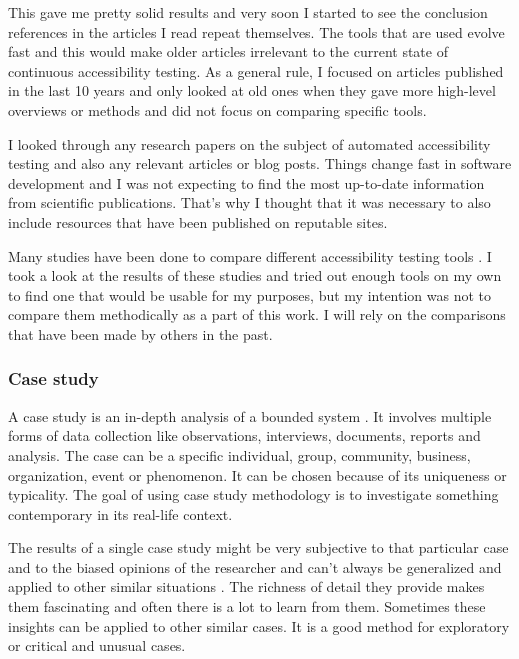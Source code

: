 \documentclass{master_thesis}
\begin{document}
This gave me pretty solid results and very soon I started to see the conclusion references in the articles I read repeat themselves. The tools that are used evolve fast and this would make older articles irrelevant to the current state of continuous accessibility testing. As a general rule, I focused on articles published in the last 10 years and only looked at old ones when they gave more high-level overviews or methods and did not focus on comparing specific tools.

I looked through any research papers on the subject of automated accessibility testing and also any relevant articles or blog posts. Things change fast in software development and I was not expecting to find the most up-to-date information from scientific publications. That's why I thought that it was necessary to also include resources that have been published on reputable sites.

Many studies have been done to compare different accessibility testing tools \citep{Alsaeedi2020, Ismailova2022, Sane2021, Vigo2013, RybinKoob2022, Duran2017}. I took a look at the results of these studies and tried out enough tools on my own to find one that would be usable for my purposes, but my intention was not to compare them methodically as a part of this work. I will rely on the comparisons that have been made by others in the past.

\subsubsection{Case study}

A case study is an in-depth analysis of a bounded system \citep{Range2023}. It involves multiple forms of data collection like observations, interviews, documents, reports and analysis. The case can be a specific individual, group, community, business, organization, event or phenomenon. It can be chosen because of its uniqueness or typicality. The goal of using case study methodology is to investigate something contemporary in its real-life context.

The results of a single case study might be very subjective to that particular case and to the biased opinions of the researcher and can't always be generalized and applied to other similar situations \citep{Range2023}. The richness of detail they provide makes them fascinating and often there is a lot to learn from them. Sometimes these insights can be applied to other similar cases. It is a good method for exploratory or critical and unusual cases.
\end{document}
